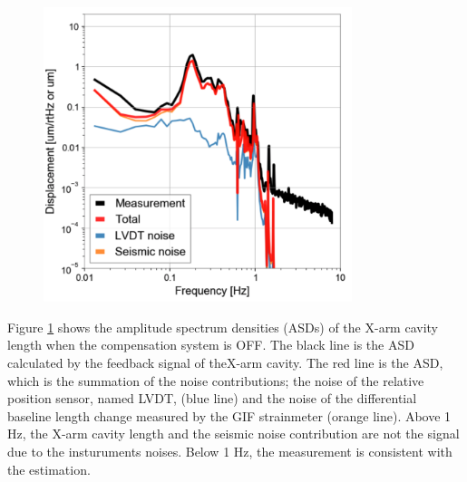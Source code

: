 \begin{figure}[h]
  \centering
  \includegraphics[width=9cm]{./img_chap6/img612.png}
  \label{img:img612} \hfill\vspace{10pt}
\end{figure}
Figure \ref{img:img612} shows the amplitude spectrum densities (ASDs) of the X-arm cavity length when the compensation system is OFF. The black line is the ASD calculated by the feedback signal of theX-arm cavity. The red line is the ASD, which is the summation of the noise contributions; the noise of the relative position sensor, named LVDT, (blue line) and the noise of the differential baseline length change measured by the GIF strainmeter (orange line). Above 1 Hz, the X-arm cavity length and the seismic noise contribution are not the signal due to the insturuments noises. Below 1 Hz, the measurement is consistent with the estimation.

